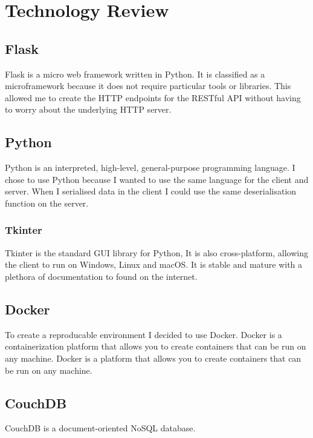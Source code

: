 \chapter{Technology Review}

\section{Flask}
Flask is a micro web framework written in Python.
It is classified as a microframework because it does not require particular tools or libraries.
This allowed me to create the HTTP endpoints for the RESTful API without having to worry about the underlying HTTP server.

\section{Python}
Python is an interpreted, high-level, general-purpose programming language.
I chose to use Python because I wanted to use the same language for the client and server.
When I serialised data in the client I could use the same deserialisation function on the server.

\subsection{Tkinter}
Tkinter is the standard GUI library for Python,
It is also cross-platform, allowing the client to run on Windows, Linux and macOS.
It is stable and mature with a plethora of documentation to found on the internet.

\section{Docker}
To create a reproducable environment I decided to use Docker.
Docker is a containerization platform that allows you to create containers that can be run on any machine.
Docker is a platform that allows you to create containers that can be run on any machine.

\section{CouchDB}
CouchDB is a document-oriented NoSQL database.

